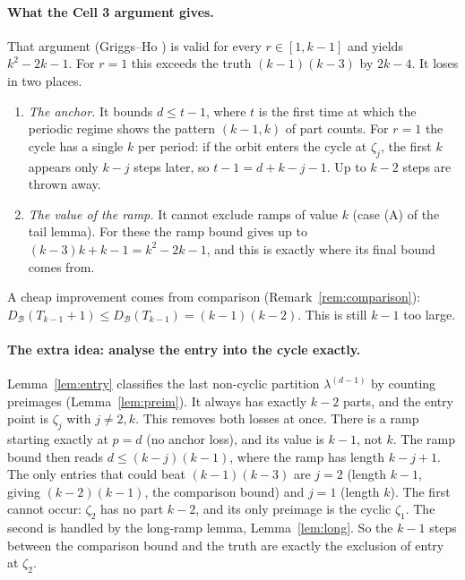 \documentclass[11pt]{article}
\theoremstyle{definition}
\newcommand{\DB}{D_{\mathcal{B}}}
\renewcommand{\le}{\leqslant}
\begin{document}
\paragraph{What the Cell 3 argument gives.}  That argument (Griggs--Ho \cite[Thm.~4.4]{GH}) is valid for
every $r\in[1,k-1]$ and yields $k^2-2k-1$.  For $r=1$ this exceeds the truth $(k-1)(k-3)$ by $2k-4$.  It
loses in two places.
\begin{enumerate}
\item \emph{The anchor.}  It bounds $d\le t-1$, where $t$ is the first time at which the periodic regime
shows the pattern $(k-1,k)$ of part counts.  For $r=1$ the cycle has a single $k$ per period: if the orbit
enters the cycle at $\zeta_j$, the first $k$ appears only $k-j$ steps later, so $t-1=d+k-j-1$.  Up to $k-2$
steps are thrown away.
\item \emph{The value of the ramp.}  It cannot exclude ramps of value $k$ (case (A) of the tail lemma).  For
these the ramp bound gives up to $(k-3)k+k-1=k^2-2k-1$, and this is exactly where its final bound comes
from.
\end{enumerate}
A cheap improvement comes from comparison (Remark~\ref{rem:comparison}): $\DB(T_{k-1}+1)\le\DB(T_{k-1})=(k-1)(k-2)$.
This is still $k-1$ too large.

\paragraph{The extra idea: analyse the entry into the cycle exactly.}  Lemma~\ref{lem:entry} classifies the
last non-cyclic partition $\lambda^{(d-1)}$ by counting preimages (Lemma~\ref{lem:preim}).  It always has exactly $k-2$
parts, and the entry point is $\zeta_j$ with $j\ne2,k$.  This removes both losses at once.  There is a ramp
starting exactly at $p=d$ (no anchor loss), and its value is $k-1$, not $k$.  The ramp bound then reads
$d\le(k-j)(k-1)$, where the ramp has length $k-j+1$.  The only entries that could beat $(k-1)(k-3)$ are
$j=2$ (length $k-1$, giving $(k-2)(k-1)$, the comparison bound) and $j=1$ (length $k$).  The first cannot
occur: $\zeta_2$ has no part $k-2$, and its only preimage is the cyclic
$\zeta_1$.  The second is handled by the long-ramp lemma, Lemma~\ref{lem:long}.  So the $k-1$ steps between
the comparison bound and the truth are exactly the exclusion of entry at $\zeta_2$.
\end{document}
